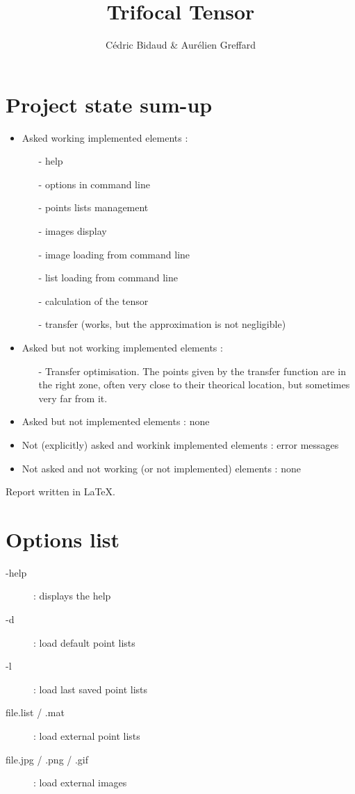 \documentclass[a4paper,10pt]{report}
\title{Trifocal Tensor}
\author{Cédric Bidaud & Aurélien Greffard}
\begin{document}
\maketitle

\section*{Project state sum-up}

\begin{itemize}
 \item Asked working implemented elements :
 \begin{itemize}
   \item[-] help
   \item[-] options in command line
   \item[-] points lists management
   \item[-] images display
   \item[-] image loading from command line
   \item[-] list loading from command line
   \item[-] calculation of the tensor
   \item[-] transfer (works, but the approximation is not negligible)
 \end{itemize}
 \item Asked but not working implemented elements :
 \begin{itemize}
  \item[-] Transfer optimisation. The points given by the transfer function are in the 
  right zone, often very close to their theorical location, but sometimes very far from it.
 \end{itemize}
 \item Asked but not implemented elements : none
 \item Not (explicitly) asked and workink implemented elements : error messages
 \item Not asked and not working (or not implemented) elements : none
\end{itemize}

Report written in LaTeX.

\section*{Options list}

\begin{description}
 \item[-help] : displays the help
 \item[-d] : load default point lists
 \item[-l] : load last saved point lists
 \item[file.list / .mat] : load external point lists
 \item[file.jpg / .png / .gif] : load external images
\end{description}
\end{document}

